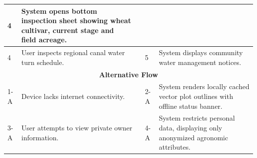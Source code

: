 \documentclass{FastFyp}
\begin{document}
\begin{table}[!ht]
\begin{tabular}{|lllll|}
  \multicolumn{1}{p{0.8cm}|}{4} &
  \multicolumn{1}{p{5.6cm}|}{System opens bottom inspection sheet showing wheat cultivar, current stage and field acreage.} \\ \hline
\multicolumn{1}{|p{0.8cm}|}{4} &
  \multicolumn{2}{p{6.0cm}|}{User inspects regional canal water turn schedule.} &
  \multicolumn{1}{p{0.8cm}|}{5} &
  \multicolumn{1}{p{5.6cm}|}{System displays community water management notices.} \\ \hline
\multicolumn{5}{|c|}{\textbf{Alternative Flow}} \\ \hline
\multicolumn{1}{|p{0.8cm}|}{1-A} &
  \multicolumn{2}{p{6.0cm}|}{Device lacks internet connectivity.} &
  \multicolumn{1}{p{0.8cm}|}{2-A} &
  \multicolumn{1}{p{5.6cm}|}{System renders locally cached vector plot outlines with offline status banner.} \\ \hline
\multicolumn{1}{|p{0.8cm}|}{3-A} &
  \multicolumn{2}{p{6.0cm}|}{User attempts to view private owner information.} &
  \multicolumn{1}{p{0.8cm}|}{4-A} &
  \multicolumn{1}{p{5.6cm}|}{System restricts personal data, displaying only anonymized agronomic attributes.} \\ \hline
\end{tabular}
\end{table}
\end{document}
